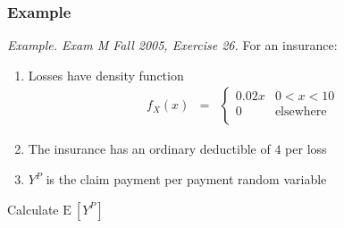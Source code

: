 \documentclass{beamer}
\begin{document}
\begin{frame}[shrink=2]
\frametitle{Example} \textit{Example. Exam M Fall 2005, Exercise
26.} For an insurance:

\begin{enumerate}
\item Losses have density function
\begin{eqnarray*}
f_X(x)&=& \left \{
\begin{array}{cc}
0.02x & 0<x<10\\
0 & \text{elsewhere}\\
\end{array}
\right.
\end{eqnarray*} \vspace{2mm}

\item The insurance has an ordinary deductible of $4$ per loss \vspace{2mm}

\item $Y^P$ is the claim payment per payment random variable \vspace{2mm}

\end{enumerate}
Calculate $\mathrm{E~}[Y^P]$\\
\end{frame}
\end{document}

